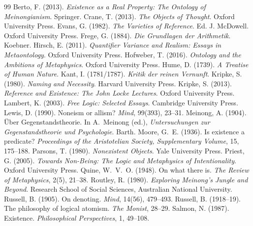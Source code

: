 \documentclass{situationist-preprint}
\begin{document}
\begin{thebibliography}{99}\small
{} Berto, F. (2013). \emph{Existence as a Real Property: The Ontology of Meinongianism}. Springer.
 Crane, T. (2013). \emph{The Objects of Thought}. Oxford University Press.
 Evans, G. (1982). \emph{The Varieties of Reference}. Ed. J. McDowell. Oxford University Press.
 Frege, G. (1884). \emph{Die Grundlagen der Arithmetik}. Koebner.
 Hirsch, E. (2011). \emph{Quantifier Variance and Realism: Essays in Metaontology}. Oxford University Press.
 Hofweber, T. (2016). \emph{Ontology and the Ambitions of Metaphysics}. Oxford University Press.
 Hume, D. (1739). \emph{A Treatise of Human Nature}.
 Kant, I. (1781/1787). \emph{Kritik der reinen Vernunft}.
 Kripke, S. (1980). \emph{Naming and Necessity}. Harvard University Press.
 Kripke, S. (2013). \emph{Reference and Existence: The John Locke Lectures}. Oxford University Press.
 Lambert, K. (2003). \emph{Free Logic: Selected Essays}. Cambridge University Press.
 Lewis, D. (1990). Noneism or allism? \emph{Mind}, 99(393), 23--31.
 Meinong, A. (1904). Über Gegenstandstheorie. In A.~Meinong (ed.), \emph{Untersuchungen zur Gegenstandstheorie und Psychologie}. Barth.
 Moore, G.~E. (1936). Is existence a predicate? \emph{Proceedings of the Aristotelian Society, Supplementary Volume}, 15, 175--188.
 Parsons, T. (1980). \emph{Nonexistent Objects}. Yale University Press.
 Priest, G. (2005). \emph{Towards Non-Being: The Logic and Metaphysics of Intentionality}. Oxford University Press.
 Quine, W.~V.~O. (1948). On what there is. \emph{The Review of Metaphysics}, 2(5), 21--38.
 Routley, R. (1980). \emph{Exploring Meinong's Jungle and Beyond}. Research School of Social Sciences, Australian National University.
 Russell, B. (1905). On denoting. \emph{Mind}, 14(56), 479--493.
 Russell, B. (1918--19). The philosophy of logical atomism. \emph{The Monist}, 28--29.
 Salmon, N. (1987). Existence. \emph{Philosophical Perspectives}, 1, 49--108.

\end{thebibliography}
\end{document}

